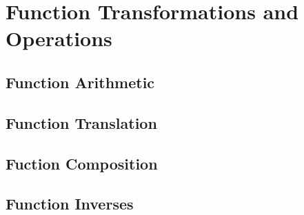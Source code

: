         \section{Function Transformations and Operations}
        \subsection{Function Arithmetic}
        \subsection{Function Translation}
        \subsection{Fuction Composition}
        \subsection{Function Inverses}
